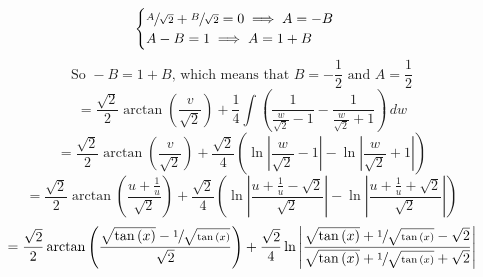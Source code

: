\documentclass[12pt]{article}
\begin{document}
    \[
        \begin{cases}
            \sfrac{A}{\sqrt{2}} +  \sfrac{B}{\sqrt{2}} = 0 
            \implies A = -B \\
            A - B = 1 \implies A = 1 + B  \\
        \end{cases}
    \]
    \[
        \text{So } -B = 1 + B
        \text{, which means that } B = -\dfrac{1}{2}
        \text{ and } A = \dfrac{1}{2}
    \]
    \[
        = \frac{\sqrt{2}}{2}\arctan{\left(\frac{v}{\sqrt{2}}\right)} 
        + \frac{1}{4}\int \left(\frac{1}{\frac{w}{\sqrt{2}} - 1} - \frac{1}
        {\frac{w}{\sqrt{2}} + 1}\right) \, dw 
    \]
    \[
        = \frac{\sqrt{2}}{2}\arctan{\left(\frac{v}{\sqrt{2}}\right)} 
        + \frac{\sqrt{2}}{4} \left(\ln{\left|\frac{w}{\sqrt{2}} - 1\right|} 
        - \ln{\left|\frac{w}{\sqrt{2}} + 1\right|}\right) 
    \]
    \[
        = \frac{\sqrt{2}}{2}\arctan{\left(\frac{u + \frac{1}{u}}{\sqrt{2}}
        \right)} + \frac{\sqrt{2}}{4} \left(\ln{\left|\frac{u + \frac{1}{u} 
        - \sqrt{2}}{\sqrt{2}}\right|} - \ln{\left|\frac{u + \frac{1}{u} 
        + \sqrt{2}}{\sqrt{2}}\right|}\right) 
    \]
    \[
        = \dfrac{\sqrt{2}}{2}\arctan{ 
            \left(
                \dfrac{ \sqrt{\tan{(x)}} 
                - \sfrac{1}{ \sqrt{\tan{(x)}}}}{\sqrt{2}} 
            \right)
        }
        + \dfrac{\sqrt{2}}{4} 
        \ln{\left| 
            \dfrac{\sqrt{\tan{(x)}} + \sfrac{1}{ \sqrt{\tan{(x)}}} - \sqrt{2}}
            {\sqrt{\tan{(x)}} + \sfrac{1}{ \sqrt{\tan{(x)}}} + \sqrt{2}}
        \right|}
    \]

    \newpage
\end{document}
